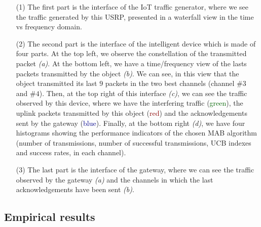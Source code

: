 \begin{enumerate}[leftmargin=6mm]
    \item[(1)]
The first part is the interface of the IoT traffic generator, where we see the traffic generated by this USRP, presented in a waterfall view in the time vs frequency domain.

    \item[(2)]
The second part is the interface of the intelligent device which is made of four parts.
At the top left, we observe the constellation of the transmitted packet \emph{(a)}.
At the bottom left, we have a time/frequency view of the lasts packets transmitted by the object \emph{(b)}.
We can see, in this view that the object transmitted its last $9$ packets in the two best channels (channel $\#3$ and $\#4$).
Then, at the top right of this interface \emph{(c)}, we can see the traffic observed by this device, where we have the interfering traffic (\textcolor{darkgreen}{green}), the uplink packets transmitted by this object (\textcolor{darkred}{red}) and the acknowledgements sent by the gateway (\textcolor{darkblue}{blue}).
Finally, at the bottom right \emph{(d)}, we have four histograms showing the performance indicators of the chosen MAB algorithm (number of transmissions, number of successful transmissions, UCB indexes and success rates, in each channel).

    \item[(3)]
The last part is the interface of the gateway, where we can see the traffic observed by the gateway \emph{(a)} and the channels in which the last acknowledgements have been sent \emph{(b)}.
\end{enumerate}


\subsection{Empirical results}
\label{sub:42:results}


